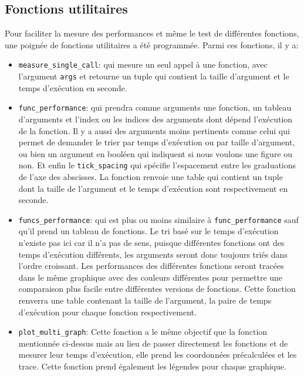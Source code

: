 \documentclass[12pt]{article}
\begin{document}
\subsection{Fonctions utilitaires}
Pour faciliter la mesure des performances et même le test de différentes fonctions, une poignée de fonctions utilitaires a été programmée. Parmi ces fonctions, il y a:
\begin{itemize}
    \item \texttt{measure\_single\_call}: qui mesure un seul appel à une fonction, avec l'argument \texttt{args} et retourne un tuple qui contient la taille d'argument et le temps d'exécution en seconde.
    \item \texttt{func\_performance}: qui prendra comme arguments une fonction, un tableau d'arguments et l'index ou les indices des arguments dont dépend l'exécution de la fonction. Il y a aussi des arguments moins pertinents comme celui qui permet de demander le trier par temps d'exécution ou par taille d'argument, ou bien un argument en booléen qui indiquent si nous voulons une figure ou non. Et enfin le \texttt{tick\_spacing} qui spécifie l'espacement entre les graduations de l'axe des abscisses. La fonction renvoie une table qui contient un tuple dont la taille de l'argument et le temps d'exécution sont respectivement en seconde.
    \item \texttt{funcs\_performance}: qui est plus ou moins similaire à \texttt{func\_performance} sauf qu'il prend un tableau de fonctions. Le tri basé sur le temps d’exécution n’existe pas ici car il n’a pas de sens, puisque différentes fonctions ont des temps d’exécution différents, les arguments seront donc toujours triés dans l’ordre croissant. Les performances des différentes fonctions seront tracées dans le même graphique avec des couleurs différentes pour permettre une comparaison plus facile entre différentes versions de fonctions. Cette fonction renverra une table contenant la taille de l'argument, la paire de temps d'exécution pour chaque fonction respectivement.
    \item \texttt{plot\_multi\_graph}: Cette fonction a le même objectif que la fonction mentionnée ci-dessus mais au lieu de passer directement les fonctions et de mesurer leur temps d'exécution, elle prend les coordonnées précalculées et les trace. Cette fonction prend également les légendes pour chaque graphique.

\end{itemize}
\end{document}
